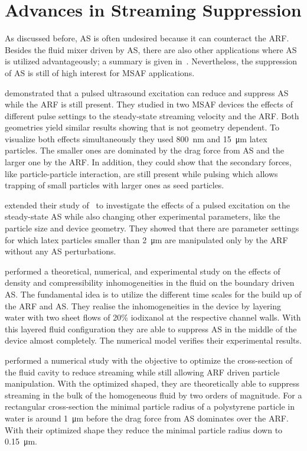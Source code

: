 \section{Advances in Streaming Suppression}

As discussed before, AS is often undesired because it can counteract the ARF. 
Besides the fluid mixer driven by AS, there are also other applications where 
AS is utilized advantageously; a summary is given in~\cite{Wiklund2012a}. 
Nevertheless, the suppression of AS is still of high interest for MSAF 
applications.

 demonstrated that a pulsed ultrasound excitation can reduce 
and suppress AS while the ARF is still present. They studied in two MSAF 
devices the effects of different pulse settings to the steady-state streaming 
velocity and the ARF. Both geometries yield similar results showing that is not 
geometry dependent. To visualize both effects simultaneously they used 
\SI{800}{\nm} and \SI{15}{\um} latex particles. The smaller ones are dominated 
by the drag force from AS and the larger one by the ARF. In addition, they 
could show that the secondary forces, like particle-particle interaction, are 
still present while pulsing which allows trapping of small particles with 
larger ones as seed particles.

 extended their study of~\cite{Hoyos2013} to investigate the 
effects of a pulsed excitation on the steady-state AS while also changing other 
experimental parameters, like the particle size and device geometry. They 
showed that there are parameter settings for which latex particles smaller than 
\SI{2}{\um} are manipulated only by the ARF without any AS perturbations.

 performed a theoretical, numerical, and experimental study 
on the effects of density and compressibility inhomogeneities in the fluid on 
the boundary driven AS. The fundamental idea is to utilize the different time 
scales for the build up of the ARF and AS. They realise the inhomogeneities in 
the device by layering water with two sheet flows of 20\% iodixanol at the 
respective channel walls. With this layered fluid configuration they are able 
to suppress AS in the middle of the device almost completely. The numerical 
model verifies their experimental results.

 performed a numerical study with the objective to optimize the 
cross-section of the fluid cavity to reduce streaming while still allowing ARF 
driven particle manipulation. With the optimized shaped, they are theoretically 
able to suppress streaming in the bulk of the homogeneous fluid by two orders 
of magnitude. For a rectangular cross-section the minimal particle radius of a 
polystyrene particle in water is around \SI{1}{\um} before the drag force from 
AS dominates over the ARF. With their optimized shape they reduce the minimal 
particle radius down to \SI{0.15}{\um}.

